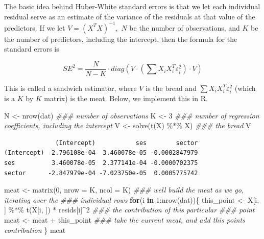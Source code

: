 \documentclass[
  letterpaper,
  DIV=11,
  numbers=noendperiod]{scrreprt}
\newenvironment{Shaded}{\begin{snugshade}}{\end{snugshade}}
\newcommand{\AttributeTok}[1]{\textcolor[rgb]{0.49,0.56,0.16}{#1}}
\newcommand{\ControlFlowTok}[1]{\textcolor[rgb]{0.00,0.44,0.13}{\textbf{#1}}}
\newcommand{\DecValTok}[1]{\textcolor[rgb]{0.25,0.63,0.44}{#1}}
\newcommand{\DocumentationTok}[1]{\textcolor[rgb]{0.73,0.13,0.13}{\textit{#1}}}
\newcommand{\FunctionTok}[1]{\textcolor[rgb]{0.02,0.16,0.49}{#1}}
\newcommand{\NormalTok}[1]{\textcolor[rgb]{0.00,0.44,0.13}{#1}}
\newcommand{\OtherTok}[1]{\textcolor[rgb]{0.00,0.44,0.13}{#1}}
\newcommand{\SpecialCharTok}[1]{\textcolor[rgb]{0.25,0.44,0.63}{#1}}
\begin{document}
The basic idea behind Huber-White standard errors is that we let each
individual residual serve as an estimate of the variance of the
residuals at that value of the predictors. If we let
\(V = (X^TX)^{-1},\) \(N\) be the number of observations, and \(K\) be
the number of predictors, including the intercept, then the formula for
the standard errors is

\[ SE^2 = \frac{N}{N-K} \cdot diag\left( V \cdot \left( \sum X_i X_i^T \varepsilon_i^2 \right) \cdot V\right) \]

This is called a sandwich estimator, where \(V\) is the bread and
\(\sum X_i X_i^T \varepsilon_i^2\) (which is a \(K\) by \(K\) matrix) is
the meat. Below, we implement this in R.

\begin{Shaded}
\begin{Highlighting}[]
\NormalTok{N }\OtherTok{\textless{}{-}} \FunctionTok{nrow}\NormalTok{(dat) }\DocumentationTok{\#\#\# number of observations}
\NormalTok{K }\OtherTok{\textless{}{-}} \DecValTok{3} \DocumentationTok{\#\#\# number of regression coefficients, including the intercept}
\NormalTok{V }\OtherTok{\textless{}{-}} \FunctionTok{solve}\NormalTok{(}\FunctionTok{t}\NormalTok{(X) }\SpecialCharTok{\%*\%}\NormalTok{ X) }\DocumentationTok{\#\#\# the bread}
\NormalTok{V}
\end{Highlighting}
\end{Shaded}

\begin{verbatim}
              (Intercept)           ses        sector
(Intercept)  2.796108e-04  3.460078e-05 -0.0002847979
ses          3.460078e-05  2.377141e-04 -0.0000702375
sector      -2.847979e-04 -7.023750e-05  0.0005775742
\end{verbatim}

\begin{Shaded}
\begin{Highlighting}[]
\NormalTok{meat }\OtherTok{\textless{}{-}} \FunctionTok{matrix}\NormalTok{(}\DecValTok{0}\NormalTok{, }\AttributeTok{nrow =}\NormalTok{ K, }\AttributeTok{ncol =}\NormalTok{ K) }\DocumentationTok{\#\#\# we\textquotesingle{}ll build the meat as we go, iterating over the }
                                      \DocumentationTok{\#\#\# individual rows}
\ControlFlowTok{for}\NormalTok{(i }\ControlFlowTok{in} \DecValTok{1}\SpecialCharTok{:}\FunctionTok{nrow}\NormalTok{(dat))\{}
\NormalTok{  this\_point }\OtherTok{\textless{}{-}}\NormalTok{ X[i, ] }\SpecialCharTok{\%*\%} \FunctionTok{t}\NormalTok{(X[i, ]) }\SpecialCharTok{*}\NormalTok{ resids[i]}\SpecialCharTok{\^{}}\DecValTok{2} \DocumentationTok{\#\#\# the contribution of this particular }
                                                   \DocumentationTok{\#\#\# point}
\NormalTok{  meat }\OtherTok{\textless{}{-}}\NormalTok{ meat }\SpecialCharTok{+}\NormalTok{ this\_point }\DocumentationTok{\#\#\# take the current meat, and add this point\textquotesingle{}s contribution}
\NormalTok{\}}
\NormalTok{meat}
\end{Highlighting}
\end{Shaded}
\end{document}
